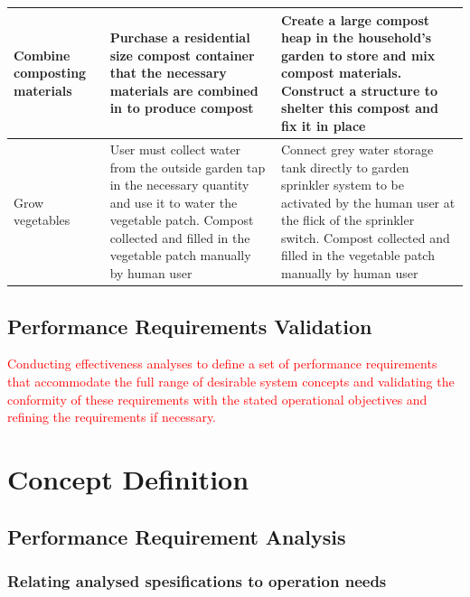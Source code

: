 \documentclass[a4paper,11pt,fleqn]{report}
\begin{document}
\begin{table}[h!]
\begin{center}
\begin{tabular}{p{3.5cm}|p{6cm}|p{6cm}}
    \hline
     Combine composting materials & Purchase a residential size compost container that the necessary materials are combined in to produce compost & Create a large compost heap in the household's garden to store and mix compost materials. Construct a structure to shelter this compost and fix it in place\\
    \hline
     Grow vegetables & User must collect water from the outside garden tap in the necessary quantity and use it to water the vegetable patch. Compost collected and filled in the vegetable patch manually by human user & Connect grey water storage tank directly to garden sprinkler system to be activated by the human user at the flick of the sprinkler switch. Compost collected and filled in the vegetable patch manually by human user\\
    \hline
    \bottomrule
\end{tabular}
\end{center}
\end{table}
%
	
\subsection{Performance Requirements Validation}
\textcolor{red}{Conducting effectiveness analyses to define a set of performance requirements that accommodate the full range of desirable system concepts and validating the conformity of these requirements with the stated operational objectives and refining the requirements if necessary.}


\section{Concept Definition}
\subsection{Performance Requirement Analysis}
\subsubsection{Relating analysed spesifications to operation needs}
\end{document}
